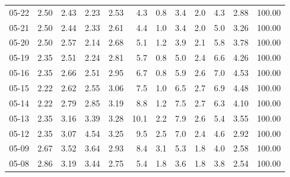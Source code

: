 \begin{threeparttable}
{\begin{tabular}{lrrrrrrrrrrr}
  05-22 &          2.50 &          2.43 &          2.23 &        2.53 &                 4.3 &                 0.8 &        3.4 &                 2.0 &              4.3 &            2.88 &                 100.00 \\
  05-21 &          2.50 &          2.44 &          2.33 &        2.61 &                 4.4 &                 1.0 &        3.4 &                 2.0 &              5.0 &            3.26 &                 100.00 \\
  05-20 &          2.50 &          2.57 &          2.14 &        2.68 &                 5.1 &                 1.2 &        3.9 &                 2.1 &              5.8 &            3.78 &                 100.00 \\
  05-19 &          2.35 &          2.51 &          2.24 &        2.81 &                 5.7 &                 0.8 &        5.0 &                 2.4 &              6.6 &            4.26 &                 100.00 \\
  05-16 &          2.35 &          2.66 &          2.51 &        2.95 &                 6.7 &                 0.8 &        5.9 &                 2.6 &              7.0 &            4.53 &                 100.00 \\
  05-15 &          2.22 &          2.62 &          2.55 &        3.06 &                 7.5 &                 1.0 &        6.5 &                 2.7 &              6.9 &            4.48 &                 100.00 \\
  05-14 &          2.22 &          2.79 &          2.85 &        3.19 &                 8.8 &                 1.2 &        7.5 &                 2.7 &              6.3 &            4.10 &                 100.00 \\
  05-13 &          2.35 &          3.16 &          3.39 &        3.28 &                10.1 &                 2.2 &        7.9 &                 2.6 &              5.4 &            3.55 &                 100.00 \\
  05-12 &          2.35 &          3.07 &          4.54 &        3.25 &                 9.5 &                 2.5 &        7.0 &                 2.4 &              4.6 &            2.92 &                 100.00 \\
  05-09 &          2.67 &          3.52 &          3.64 &        2.93 &                 8.4 &                 3.1 &        5.3 &                 1.8 &              4.0 &            2.58 &                 100.00 \\
  05-08 &          2.86 &          3.19 &          3.44 &        2.75 &                 5.4 &                 1.8 &        3.6 &                 1.8 &              3.8 &            2.54 &                 100.00 \\

\end{tabular}}
\end{threeparttable}
